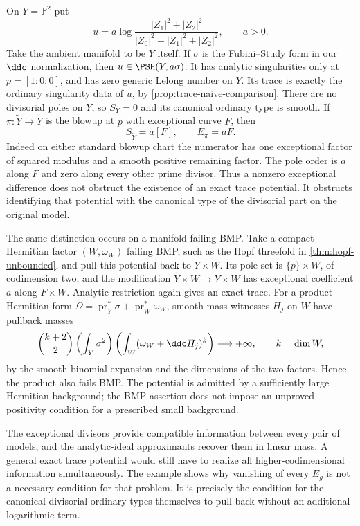 \begin{example}\label{ex:exceptional-trace-with-exact-potential}
On $Y=\mathbb P^2$ put
\[
 u=a\log\frac{|Z_1|^2+|Z_2|^2}
                   {|Z_0|^2+|Z_1|^2+|Z_2|^2},\qquad a>0.
\]
Take the ambient manifold to be $Y$ itself. If $\sigma$ is the Fubini--Study form in our $\ddc$ normalization, then $u\in\PSH(Y,a\sigma)$. It has analytic singularities only at $p=[1:0:0]$, and has zero generic Lelong number on $Y$. Its trace is exactly the ordinary singularity data of $u$, by \cref{prop:trace-naive-comparison}. There are no divisorial poles on $Y$, so $S_Y=0$ and its canonical ordinary type is smooth. If $\pi:\widetilde Y\to Y$ is the blowup at $p$ with exceptional curve $F$, then
\[
 S_{\widetilde Y}=a[F],\qquad E_\pi=aF.
\]
Indeed on either standard blowup chart the numerator has one exceptional factor of squared modulus and a smooth positive remaining factor. The pole order is $a$ along $F$ and zero along every other prime divisor. Thus a nonzero exceptional difference does not obstruct the existence of an exact trace potential. It obstructs identifying that potential with the canonical type of the divisorial part on the original model.

The same distinction occurs on a manifold failing BMP. Take a compact Hermitian factor $(W,\omega_W)$ failing BMP, such as the Hopf threefold in \cref{thm:hopf-unbounded}, and pull this potential back to $Y\times W$. Its pole set is $\{p\}\times W$, of codimension two, and the modification $\widetilde Y\times W\to Y\times W$ has exceptional coefficient $a$ along $F\times W$. Analytic restriction again gives an exact trace. For a product Hermitian form $\Omega=\operatorname{pr}_Y^*\sigma+\operatorname{pr}_W^*\omega_W$, smooth mass witnesses $H_j$ on $W$ have pullback masses
\[
 \binom{k+2}{2}\left(\int_Y\sigma^2\right)
          \left(\int_W(\omega_W+\ddc H_j)^k\right)\longrightarrow+\infty,
 \qquad k=\dim W,
\]
by the smooth binomial expansion and the dimensions of the two factors. Hence the product also fails BMP. The potential is admitted by a sufficiently large Hermitian background; the BMP assertion does not impose an unproved positivity condition for a prescribed small background.
\end{example}

The exceptional divisors provide compatible information between every pair of models, and the analytic-ideal approximants recover them in linear mass. A general exact trace potential would still have to realize all higher-codimensional information simultaneously. The example shows why vanishing of every $E_g$ is not a necessary condition for that problem. It is precisely the condition for the canonical divisorial ordinary types themselves to pull back without an additional logarithmic term.

